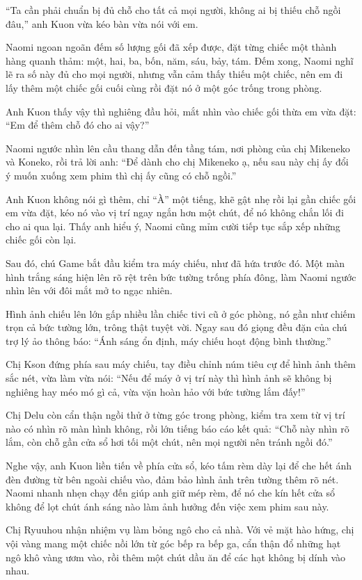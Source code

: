 \documentclass[../main.tex]{subfiles}
\begin{document}
``Ta cần phải chuẩn bị đủ chỗ cho tất cả mọi người, không ai bị thiếu chỗ ngồi đâu,'' anh Kuon vừa kéo bàn vừa nói với em.

Naomi ngoan ngoãn đếm số lượng gối đã xếp được, đặt từng chiếc một thành hàng quanh thảm: một, hai, ba, bốn, năm, sáu, bảy, tám. Đếm xong, Naomi nghĩ lẽ ra số này đủ cho mọi người, nhưng vẫn cảm thấy thiếu một chiếc, nên em đi lấy thêm một chiếc gối cuối cùng rồi đặt nó ở một góc trống trong phòng.

Anh Kuon thấy vậy thì nghiêng đầu hỏi, mắt nhìn vào chiếc gối thừa em vừa đặt: ``Em để thêm chỗ đó cho ai vậy?''

Naomi ngước nhìn lên cầu thang dẫn đến tầng tám, nơi phòng của chị Mikeneko và Koneko, rồi trả lời anh: ``Để dành cho chị Mikeneko ạ, nếu sau này chị ấy đổi ý muốn xuống xem phim thì chị ấy cũng có chỗ ngồi.''

Anh Kuon không nói gì thêm, chỉ ``À'' một tiếng, khẽ gật nhẹ rồi lại gần chiếc gối em vừa đặt, kéo nó vào vị trí ngay ngắn hơn một chút, để nó không chắn lối đi cho ai qua lại. Thấy anh hiểu ý, Naomi cũng mỉm cười tiếp tục sắp xếp những chiếc gối còn lại.

Sau đó, chú Game bắt đầu kiểm tra máy chiếu, như đã hứa trước đó. Một màn hình trắng sáng hiện lên rõ rệt trên bức tường trống phía đông, làm Naomi ngước nhìn lên với đôi mắt mở to ngạc nhiên.

Hình ảnh chiếu lên lớn gấp nhiều lần chiếc tivi cũ ở góc phòng, nó gần như chiếm trọn cả bức tường lớn, trông thật tuyệt vời. Ngay sau đó giọng đều đặn của chú trợ lý ảo thông báo: ``Ánh sáng ổn định, máy chiếu hoạt động bình thường.''

Chị Kson đứng phía sau máy chiếu, tay điều chỉnh núm tiêu cự để hình ảnh thêm sắc nét, vừa làm vừa nói: ``Nếu để máy ở vị trí này thì hình ảnh sẽ không bị nghiêng hay méo mó gì cả, vừa vặn hoàn hảo với bức tường lắm đấy!''

Chị Delu còn cẩn thận ngồi thử ở từng góc trong phòng, kiểm tra xem từ vị trí nào có nhìn rõ màn hình không, rồi lớn tiếng báo cáo kết quả: ``Chỗ này nhìn rõ lắm, còn chỗ gần cửa sổ hơi tối một chút, nên mọi người nên tránh ngồi đó.''

Nghe vậy, anh Kuon liền tiến về phía cửa sổ, kéo tấm rèm dày lại để che hết ánh đèn đường từ bên ngoài chiếu vào, đảm bảo hình ảnh trên tường thêm rõ nét. Naomi nhanh nhẹn chạy đến giúp anh giữ mép rèm, để nó che kín hết cửa sổ không để lọt chút ánh sáng nào làm ảnh hưởng đến việc xem phim sau này.

Chị Ryuuhou nhận nhiệm vụ làm bỏng ngô cho cả nhà. Với vẻ mặt hào hứng, chị vội vàng mang một chiếc nồi lớn từ góc bếp ra bếp ga, cẩn thận đổ những hạt ngô khô vàng ươm vào, rồi thêm một chút dầu ăn để các hạt không bị dính vào nhau.
\end{document}

